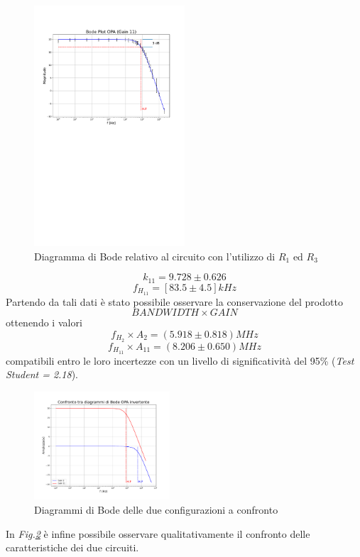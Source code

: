 \documentclass[journal]{IEEEtran}
\begin{document}
\begin{figure}[H]%
\begin {center}
\includegraphics[width=0.50\textwidth]{analysis/output/OPA-bode_gain11(mag).pdf}
\caption{Diagramma di Bode relativo al circuito con l'utilizzo di $R_1$ ed $R_3$ }
\label{fig:gain11}
\end {center}
\end{figure}
\[k_{11} = 9.728 \pm 0.626\] 
\[f_{H_{11}} = [ 83.5 \pm 4.5 ]kHz\]
Partendo da tali dati è stato possibile osservare la conservazione del prodotto 
\[BAND WIDTH \times GAIN\]
ottenendo i valori \[f_{H_{2}} \times A_2 = (5.918 \pm  0.818) MHz\]  \[f_{H_{11}} \times A_{11} = (8.206 \pm 0.650) MHz\] compatibili entro le loro incertezze con un livello di significatività del 95\% (\textit{Test Student = 2.18}).
\begin{figure}[H]%
\begin {center}
\includegraphics[width=0.45\textwidth]{analysis/output/OPA-bode_gain_comparison(mag).pdf}
\caption{Diagrammi di Bode delle due configurazioni a confronto}
\label{fig:gain-compare}
\end {center}
\end{figure}
In \textit{Fig.\ref{fig:gain-compare}} è infine possibile osservare qualitativamente il confronto delle caratteristiche dei due circuiti.
\end{document}
